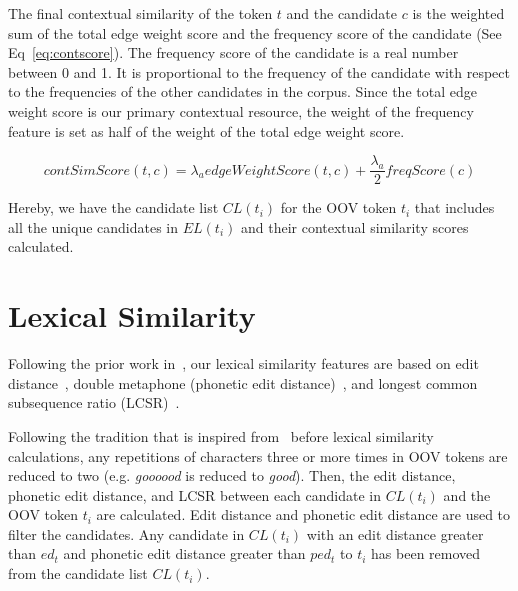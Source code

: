 \documentclass[a4paper,onesided,12pt]{report}
\begin{document}
The final contextual similarity of the token $t$ and the candidate $c$ is the weighted sum of the total edge weight score and the frequency score of the candidate (See Eq~\ref{eq:contscore}). The frequency score of the candidate is a real number between 0 and 1. It is proportional to the frequency of the candidate with respect to the frequencies of the other candidates in the corpus. Since the total edge weight score is our primary contextual resource, the weight of the frequency feature is set as half of the weight of the total edge weight score.

\begin{equation}
contSimScore(t,c) = \lambda_a edgeWeightScore(t,c) + \frac{\lambda_a} 2 freqScore(c)
\label{eq:contscore}
\end{equation}

Hereby, we have the candidate list $CL(t_{i})$ for the OOV token $t_i$ that includes all the unique candidates in $EL(t_{i})$ and their contextual similarity scores calculated.

\section{Lexical Similarity}

Following the prior work in~\cite{Han:2011:LNS:2002472.2002520,DBLP:conf/acl/HassanM13}, our lexical similarity features are based on edit distance~\cite{levenshtein1966bcc}, double metaphone (phonetic edit distance)~\cite{Philips:2000:DMS:349124.349132}, and longest common subsequence ratio (LCSR)~\cite{Contractor:2010:UCN:1944566.1944588}.

Following the tradition that is inspired from~\cite{Kaufmann2010} before lexical similarity calculations, any repetitions of characters three or more times in OOV tokens are reduced to two (e.g. \emph{goooood} is reduced to \emph{good}). Then, the edit distance, phonetic edit distance, and LCSR between each candidate in $CL(t_{i})$ and the OOV token $t_i$ are calculated. Edit distance and phonetic edit distance are used to filter the candidates. Any candidate in $CL(t_{i})$ with an edit distance greater than $ed_t$ and phonetic edit distance greater than $ped_t$ to $t_i$ has been removed from the candidate list $CL(t_{i})$.
\end{document}
